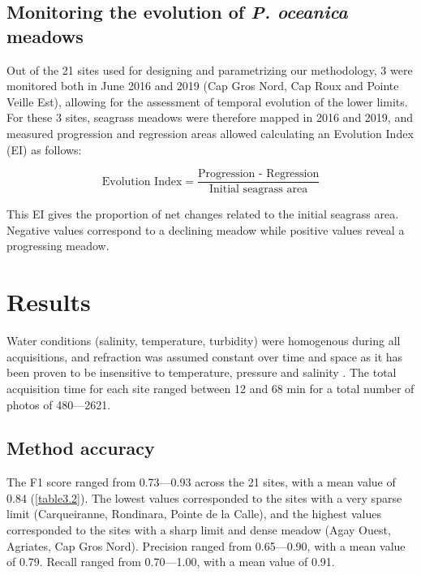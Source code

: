 \subsection{Monitoring the evolution of \textit{P. oceanica} meadows}
Out of the 21 sites used for designing and parametrizing our methodology, 3 were monitored both in June 2016 and 2019 (Cap Gros Nord, Cap Roux and Pointe Veille Est), allowing for the assessment of temporal evolution of the lower limits. For these 3 sites, seagrass meadows were therefore mapped in 2016 and 2019, and measured progression and regression areas allowed calculating an Evolution Index (EI) as follows:

\begin{equation}
\text{Evolution Index}=\frac{\text{Progression - Regression}}{\text{Initial seagrass area}}
\end{equation}

This EI gives the proportion of net changes related to the initial seagrass area. Negative values correspond to a declining meadow while positive values reveal a progressing meadow.


\section{Results}\label{chapitre3_3}
Water conditions (salinity, temperature, turbidity) were homogenous during all acquisitions, and refraction was assumed constant over time and space as it has been proven to be insensitive to temperature, pressure and salinity \citep{moore_underwater_1976}. The total acquisition time for each site ranged between 12 and 68 min for a total number of photos of 480---2621. 

\subsection{Method accuracy}
The F1 score ranged from 0.73---0.93 across the 21 sites, with a mean value of 0.84 (\autoref{table3.2}). The lowest values corresponded to the sites with a very sparse limit (Carqueiranne, Rondinara, Pointe de la Calle), and the highest values corresponded to the sites with a sharp limit and dense meadow (Agay Ouest, Agriates, Cap Gros Nord). Precision ranged from 0.65---0.90, with a mean value of 0.79. Recall ranged from 0.70---1.00, with a mean value of 0.91.

